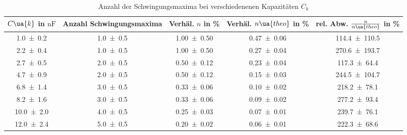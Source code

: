 \begin{table} 
\centering 
\caption{Anzahl der Schwingungsmaxima bei verschiedenenen Kapazitäten $C_k$} 
\label{teila_n_ck} 
\begin{tabular}{S S S S S } 
\toprule  
{$C\ua{k}$ in $\si{\nano\farad}$} & {Anzahl Schwingungsmaxima} & {Verhäl. $n$ in \%} & { Verhäl. $n\ua{theo}$ in \%} & {rel. Abw. $\frac{n}{n\ua{theo}}$ in \%}  \\ 
\midrule  
 \num{1.0\pm0.2} & \num{1.0\pm0.5} & \num{1.00\pm0.50} & \num{0.47\pm0.06} & \num{114.4\pm110.5}\\ 
\num{2.2\pm0.4} & \num{1.0\pm0.5} & \num{1.00\pm0.50} & \num{0.27\pm0.04} & \num{270.6\pm193.7}\\ 
\num{2.7\pm0.5} & \num{2.0\pm0.5} & \num{0.50\pm0.12} & \num{0.23\pm0.04} & \num{117.3\pm64.4}\\ 
\num{4.7\pm0.9} & \num{2.0\pm0.5} & \num{0.50\pm0.12} & \num{0.15\pm0.03} & \num{244.5\pm104.7}\\ 
\num{6.8\pm1.4} & \num{3.0\pm0.5} & \num{0.33\pm0.06} & \num{0.10\pm0.02} & \num{218.2\pm78.1}\\ 
\num{8.2\pm1.6} & \num{3.0\pm0.5} & \num{0.33\pm0.06} & \num{0.09\pm0.02} & \num{277.2\pm93.4}\\ 
\num{10.0\pm2.0} & \num{4.0\pm0.5} & \num{0.25\pm0.03} & \num{0.07\pm0.01} & \num{239.7\pm76.1}\\ 
\num{12.0\pm2.4} & \num{5.0\pm0.5} & \num{0.20\pm0.02} & \num{0.06\pm0.01} & \num{222.3\pm68.6}\\ 
\bottomrule 
\end{tabular} 
\end{table}